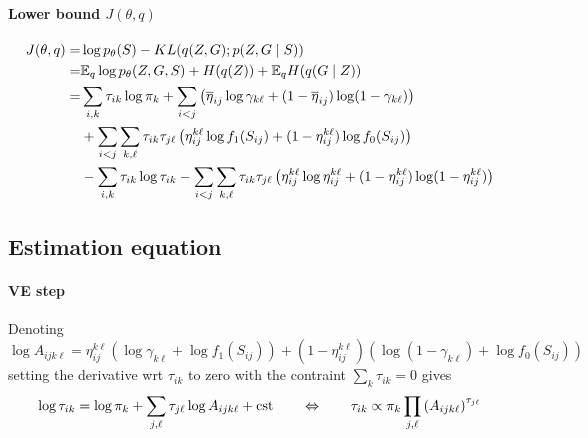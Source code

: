\paragraph{Lower bound $J(\theta, q)$}
\begin{align} \label{eq:lowerBound}
 J(\theta, q) 
 = & \log p_\theta(S) - KL(q(Z, G) ; p(Z, G \mid S)) \nonumber \\
 = & \mathbb E_q \log p_\theta(Z, G, S) + H(q(Z))  + \mathbb E_q H(q(G \mid Z)) \\ 
 = & \sum_{i, k} \tau_{ik} \log \pi_k 
 + \sum_{i < j} \left(\overline{\eta}_{ij} \log \gamma_{k\ell} + (1 - \overline{\eta}_{ij}) \log (1 - \gamma_{k\ell})\right) \nonumber \\
 & + \sum_{i < j} \sum_{k, \ell} \tau_{ik} \tau_{j\ell} \left(\eta^{k\ell}_{ij} \log f_1(S_{ij}) + (1 - \eta^{k\ell}_{ij}) \log f_0(S_{ij})\right) \nonumber \\
 & - \sum_{i, k} \tau_{ik} \log \tau_{ik} - \sum_{i< j} \sum_{k, \ell} \tau_{ik} \tau_{j\ell} \left( \eta^{k\ell}_{ij} \log \eta^{k\ell}_{ij} + (1 - \eta^{k\ell}_{ij}) \log (1 - \eta^{k\ell}_{ij}) \right)
\end{align}

\subsection{Estimation equation}

\paragraph{VE step}
Denoting 
$$
\log A_{ijk\ell} = \eta^{k\ell}_{ij} \left(\log \gamma_{k\ell} + \log f_1(S_{ij})\right) + (1 - \eta^{k\ell}_{ij}) \left(\log (1 - \gamma_{k\ell}) + \log f_0(S_{ij}) \right)
$$
setting the derivative wrt $\tau_{ik}$ to zero with the contraint $\sum_{k} \tau_{ik} = 0$ gives
$$
\log \tau_{ik} = \log \pi_k + \sum_{j, \ell} \tau_{j\ell} \log A_{ijk\ell} + \text{cst}
\qquad \Leftrightarrow \qquad
\tau_{ik} \propto \pi_k \prod_{j, \ell} \left(A_{ijk\ell}\right)^{\tau_{j\ell}}
$$

